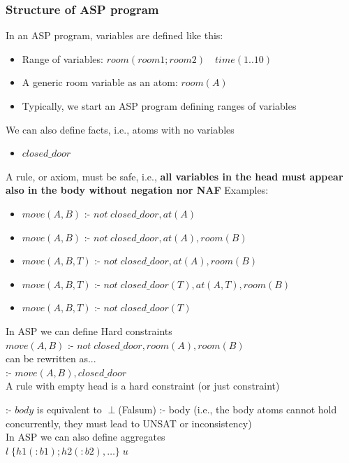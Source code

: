 \subsubsection{Structure of ASP program}
In an ASP program, variables are defined like this:
\begin{itemize}
    \item Range of variables: $room(room1; room2)\quad time(1..10)$
    \item A generic room variable as an atom: $room(A)$
    \item Typically, we start an ASP program defining ranges of variables
\end{itemize}
We can also define facts, i.e., atoms with no variables
\begin{itemize}
    \item $closed\_door$
\end{itemize}

A rule, or axiom, must be safe, i.e., \textbf{all variables in the head must appear also in the body without negation nor NAF}
Examples:
\begin{itemize}
    \item $move(A, B)$ :- $not\;closed\_door, at(A)$ \cross
    \item $move(A, B)$ :- $not\;closed\_door, at(A), room(B)$ \tick
    \item $move(A, B, T)$ :- $not\;closed\_door, at(A), room(B)$ \cross
    \item $move(A, B, T)$ :- $not\;closed\_door(T), at(A, T), room(B)$ \tick
    \item $move(A, B, T)$ :- $not\;closed\_door(T)$ \cross
\end{itemize}

In ASP we can define Hard constraints\\
$move(A, B)$ :- $not\;closed\_door, room(A), room(B)$ \\
can be rewritten as...\\
:- $move(A, B), closed\_door$\\

A rule with empty head is a hard constraint (or just constraint)

:- $body$ is equivalent to $\perp$(Falsum) :- body (i.e., the body atoms cannot hold concurrently, they must lead to UNSAT or inconsistency)\\

In ASP we can also define aggregates\\
$l\;\{h1(:b1); h2(:b2), \ldots\}\;u$

